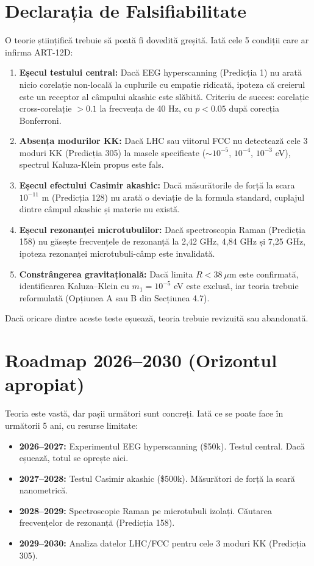 \documentclass[11pt,a4paper]{article}
\begin{document}
\section{Declarația de Falsifiabilitate}
O teorie științifică trebuie să poată fi dovedită greșită. Iată cele 5 condiții care ar infirma ART-12D:
\begin{enumerate}
    \item \textbf{Eșecul testului central:} Dacă EEG hyperscanning (Predicția 1) nu arată nicio corelație non-locală la cuplurile cu empatie ridicată, ipoteza că creierul este un receptor al câmpului akashic este slăbită. Criteriu de succes: corelație cross-corelație $> 0.1$ la frecvența de 40 Hz, cu $p < 0.05$ după corecția Bonferroni.
    \item \textbf{Absența modurilor KK:} Dacă LHC sau viitorul FCC nu detectează cele 3 moduri KK (Predicția 305) la masele specificate ($\sim 10^{-5}$, $10^{-4}$, $10^{-3}$ eV), spectrul Kaluza-Klein propus este fals.
    \item \textbf{Eșecul efectului Casimir akashic:} Dacă măsurătorile de forță la scara $10^{-11}$ m (Predicția 128) nu arată o deviație de la formula standard, cuplajul dintre câmpul akashic și materie nu există.
    \item \textbf{Eșecul rezonanței microtubulilor:} Dacă spectroscopia Raman (Predicția 158) nu găsește frecvențele de rezonanță la 2{,}42 GHz, 4{,}84 GHz și 7{,}25 GHz, ipoteza rezonanței microtubuli-câmp este invalidată.
    \item \textbf{Constrângerea gravitațională:} Dacă limita $R < 38\ \mu$m este confirmată, identificarea Kaluza–Klein cu $m_1 = 10^{-5}$ eV este exclusă, iar teoria trebuie reformulată (Opțiunea A sau B din Secțiunea 4.7).
\end{enumerate}
Dacă oricare dintre aceste teste eșuează, teoria trebuie revizuită sau abandonată.

\section{Roadmap 2026–2030 (Orizontul apropiat)}
Teoria este vastă, dar pașii următori sunt concreți. Iată ce se poate face în următorii 5 ani, cu resurse limitate:
\begin{itemize}
    \item \textbf{2026–2027:} Experimentul EEG hyperscanning (\$50k). Testul central. Dacă eșuează, totul se oprește aici.
    \item \textbf{2027–2028:} Testul Casimir akashic (\$500k). Măsurători de forță la scară nanometrică.
    \item \textbf{2028–2029:} Spectroscopie Raman pe microtubuli izolați. Căutarea frecvențelor de rezonanță (Predicția 158).
    \item \textbf{2029–2030:} Analiza datelor LHC/FCC pentru cele 3 moduri KK (Predicția 305).
\end{itemize}
\end{document}
